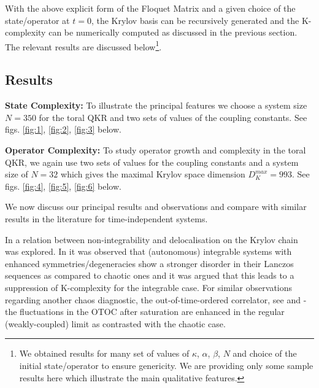 \documentclass[a4paper,12pt]{article}
\begin{document}
With the above explicit form of the Floquet Matrix and a given choice of the state/operator at $t=0$, the Krylov basis can be recursively generated and the K-complexity can be numerically computed as discussed in the previous section. The relevant results are discussed below\footnote{We obtained results for many set of values of $\kappa$, $\alpha$, $\beta$, $N$ and choice of the initial state/operator to ensure genericity. We are providing only some sample results here which illustrate the main qualitative features.}.

\subsection{Results}

\textbf{State Complexity:} To illustrate the principal features we choose a system size $N=350$ for the toral QKR and two sets of values of the coupling constants. See figs. \ref{fig:1}, \ref{fig:2}, \ref{fig:3} below.

\par \medskip

\textbf{Operator Complexity: } To study operator growth and complexity in the toral QKR, we again use two sets of values for the coupling constants and a system size of $N=32$ which gives the maximal Krylov space dimension $D_K^ {max}=993$. See figs. \ref{fig:4}, \ref{fig:5}, \ref{fig:6} below.
\par \medskip

We now discuss our principal results and observations and compare with similar results in the literature for time-independent systems.

In \cite{Dymarsky:2019elm} a relation between non-integrability and delocalisation on the Krylov chain was explored. In \cite{Rabinovici_2022, integrability_to_chaos} it was observed that (autonomous) integrable systems with enhanced symmetries/degeneracies show a stronger disorder in their Lanczos sequences as compared to chaotic ones and it was argued that this leads to a suppression of K-complexity for the integrable case. For similar observations regarding another chaos diagnostic, the out-of-time-ordered correlator, see \cite{Fortes:2019frf} and \cite{Garcia-Mata:2022voo} - the fluctuations in the OTOC after saturation are enhanced in the regular (weakly-coupled) limit as contrasted with the chaotic case. 
\end{document}
